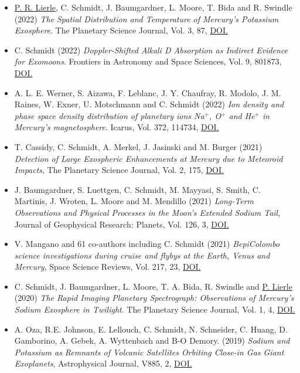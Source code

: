 \documentclass[12pt]{report}
\begin{document}
\begin{itemize} \itemsep -2pt %
  \item \underline{P. R. Lierle}, C. Schmidt, J. Baumgardner, L. Moore, T. Bida and R. Swindle (2022) \textit{The Spatial Distribution and Temperature of Mercury’s Potassium Exosphere}. The Planetary Science Journal, Vol. 3, 87, \href{https://doi.org/10.3847/PSJ/ac5c4d}{DOI.} 
  \item C. Schmidt (2022) \textit{Doppler-Shifted Alkali D Absorption as Indirect Evidence for Exomoons}. Frontiers in Astronomy and Space Sciences, Vol. 9, 801873, \href{https://doi.org/10.3389/fspas.2022.801873}{DOI.}
  \item A. L. E. Werner, S. Aizawa, F. Leblanc, J. Y. Chaufray, R. Modolo, J. M. Raines, W. Exner, U. Motschmann and C. Schmidt (2022) \textit{ Ion density and phase space density distribution of planetary ions Na$^+$, O$^+$ and He$^+$ in Mercury's magnetosphere}. Icarus, Vol. 372, 114734, \href{https://doi.org/10.1016/j.icarus.2021.114734}{DOI.}
  \item  T. Cassidy, C. Schmidt, A. Merkel, J. Jasinski and M. Burger (2021) \textit{Detection of Large Exospheric Enhancements at Mercury due to Meteoroid Impacts}, The Planetary Science Journal, Vol. 2, 175, \href{https://doi.org/10.3847/PSJ/ac1a19}{DOI.}
  \item J. Baumgardner, S. Luettgen, C. Schmidt, M. Mayyasi, S. Smith, C. Martinis, J. Wroten, L. Moore and M. Mendillo (2021) \textit{Long‐Term Observations and Physical Processes in the Moon’s Extended Sodium Tail}, Journal of Geophysical Research: Planets, Vol. 126, 3, \href{https://doi.org/10.1029/2020JE006671}{DOI.}
  \item V. Mangano and 61 co-authors including C. Schmidt (2021) \textit{BepiColombo science investigations during cruise and flybys at the Earth, Venus and Mercury}, Space Science Reviews, Vol. 217, 23, \href{https://doi.org/10.1007/s11214-021-00797-9}{DOI.} 
  \item C. Schmidt, J. Baumgardner, L. Moore, T. A. Bida, R. Swindle and \underline{P. Lierle} (2020) \textit{The Rapid Imaging Planetary Spectrograph: Observations of Mercury's Sodium Exosphere in Twilight}. The Planetary Science Journal, Vol. 1, 4, \href{https://doi.org/10.3847/PSJ/ab76c9}{DOI.}
  \item A. Oza, R.E. Johnson, E. Lellouch, C. Schmidt, N. Schneider, C. Huang, D. Gamborino, A. Gebek, A. Wyttenbach and B-O Demory. (2019) \textit{Sodium and Potassium as Remnants of Volcanic Satellites Orbiting Close-in Gas Giant Exoplanets}, Astrophysical Journal, V885, 2, \href{https://doi.org/10.3847/1538-4357/ab40cc}{DOI.}

\end{itemize}
\end{document}
